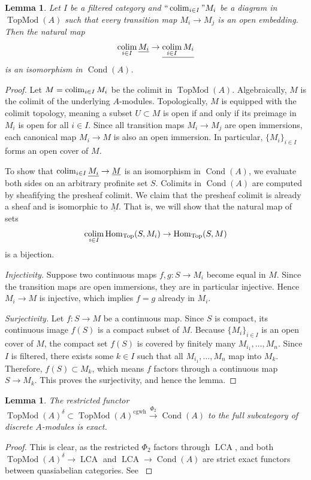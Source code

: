 \documentclass[11pt]{amsart}
\newcommand{\ra}{\rightarrow} %
\newcommand{\xra}{\xrightarrow}
\newcommand{\Hom}{\operatorname{Hom}}
\newcommand{\Top}{\operatorname{Top}}
\newcommand{\cgwh}{\operatorname{cgwh}}
\newcommand{\TopMod}{\operatorname{TopMod}}
\newcommand{\colim}{\operatornamewithlimits{\rm{colim}}}
\newcommand{\LCA}{\operatorname{LCA}}
\newcommand{\Cond}{\operatorname{Cond}}
\newcommand{\ul}{\underline}
\theoremstyle{plain}
\newtheorem{lem}[prop]{Lemma}
\theoremstyle{definition}
\numberwithin{equation}{prop}
\begin{document}
\begin{lem}\label{ColimOpenImm}
Let $I$ be a filtered category and $``\colim_{i\in I}" M_i$ be a diagram in $\TopMod(A)$ such that every transition map $M_i\to M_j$ is an open embedding.
Then the natural map
$$ \colim_{i\in I} \ul{M_i} \ra \ul{\colim_{i\in I} M_i} $$
is an isomorphism in $\Cond(A)$.
\end{lem}
\begin{proof}
Let $M = \colim_{i\in I} M_i$ be the colimit in $\TopMod(A)$.
Algebraically, $M$ is the colimit of the underlying $A$-modules.
Topologically, $M$ is equipped with the colimit topology, meaning a subset $U \subset M$ is open if and only if its preimage in $M_i$ is open for all $i \in I$.
Since all transition maps $M_i \to M_j$ are open immersions, each canonical map $M_i \to M$ is also an open immersion.
In particular, $\{M_i\}_{i\in I}$ forms an open cover of $M$.

To show that $\colim_{i\in I} \ul{M_i} \ra \ul{M}$ is an isomorphism in $\Cond(A)$, we evaluate both sides on an arbitrary profinite set $S$.
Colimits in $\Cond(A)$ are computed by sheafifying the presheaf colimit. We claim that the presheaf colimit is already a sheaf and is isomorphic to $\ul{M}$.
That is, we will show that the natural map of sets
$$ \colim_{i\in I} \Hom_{\Top}(S, M_i) \ra \Hom_{\Top}(S, M) $$
is a bijection.

\textit{Injectivity.}
Suppose two continuous maps $f, g: S \to M_i$ become equal in $M$. Since the transition maps are open immersions, they are in particular injective. Hence $M_i \to M$ is injective, which implies $f = g$ already in $M_i$.

\textit{Surjectivity.} 
Let $f: S \to M$ be a continuous map.
Since $S$ is compact, its continuous image $f(S)$ is a compact subset of $M$.
Because $\{M_i\}_{i\in I}$ is an open cover of $M$, the compact set $f(S)$ is covered by finitely many $M_{i_1}, \dots, M_n$.
Since $I$ is filtered, there exists some $k \in I$ such that all $M_{i_1}, \dots, M_n$ map into $M_k$.
Therefore, $f(S) \subset M_k$, which means $f$ factors through a continuous map $S \to M_k$.
This proves the surjectivity, and hence the lemma.
\end{proof}





\begin{lem}\label{IndProExact0Lem}
The restricted functor
$\TopMod(A)^\delta\subset\TopMod(A)^{\cgwh}\xra{\Phi_2} \Cond(A)$
to the full subcategory of discrete $A$-modules is exact.
\end{lem}
\begin{proof}
This is clear, as the restricted $\Phi_2$ factors through $\LCA$, and both $\TopMod(A)^\delta\ra \LCA$ and $\LCA\ra \Cond(A)$ are strict exact functors between quasiabelian categories. See \cite[the last paragraph on p. 26]{CS}
\end{proof}
\end{document}
